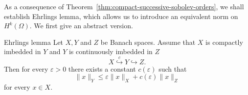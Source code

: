 As a consequence of Theorem~\ref{thm:compact-successive-sobolev-orders}, we shall establish Ehrling\textquotesingle s lemma, which allows us to introduce an equivalent norm on $H^k(\Omega)$. We first give an abstract version.

\begin{Theorem}{Ehrling\textquotesingle s lemma}
\label{thm:ehrling-compact-intermediate-norm}
Let $X,Y$ and $Z$ be Banach spaces. Assume that $X$ is compactly imbedded in $Y$ and $Y$ is continuously imbedded in $Z$\[X\overset{c}{\hookrightarrow}Y\hookrightarrow Z.\]Then for every $\varepsilon>0$ there exists a constant $c(\varepsilon)$ such that
\begin{equation}\label{eq:ehrling-compact-intermediate-norm-bound}
\|x\|_Y\leq\varepsilon\|x\|_X+c(\varepsilon)\|x\|_Z
\end{equation}
for every $x\in X$.
\end{Theorem}

\begingroup
{}
\renewcommand{\endProof}{\par\nobreak\hfill$\blacksquare$\par\vspace{0.1cm}}
\endgroup
